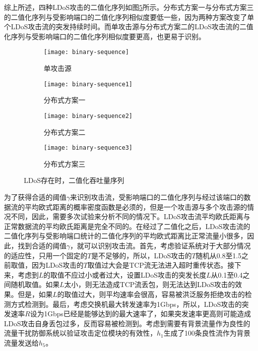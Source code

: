 综上所述，四种LDoS攻击的二值化序列如图\ref{fig:binary-sequence-all}所示。分布式方案一与分布式方案三的二值化序列与受影响端口的二值化序列相似度要低一些，因为两种方案改变了单个LDoS攻击流的突发持续时间。而单攻击源与分布式方案二的LDoS攻击流的二值化序列与受影响端口的二值化序列相似度要更高，也更易于识别。


\begin{figure}
    \begin{subfigure}{.49\textwidth}
        \centering
        \texttt{[image: binary-sequence]}
        \caption{单攻击源}
        \label{fig:binary-sequence-single}
    \end{subfigure}
    \begin{subfigure}{.49\textwidth}
        \centering
        \texttt{[image: binary-sequence1]}
        \caption{分布式方案一}
        \label{fig:binary-sequence-2h-mod1}
    \end{subfigure}

    \begin{subfigure}{.49\textwidth}
        \centering
        \texttt{[image: binary-sequence2]}
        \caption{分布式方案二}
        \label{fig:binary-sequence-2h-mod2}
    \end{subfigure}
    \begin{subfigure}{.49\textwidth}
        \centering
        \texttt{[image: binary-sequence3]}
        \caption{分布式方案三}
        \label{fig:binary-sequence-2h-mod3}
    \end{subfigure}


    \caption{LDoS存在时，二值化吞吐量序列}
    \label{fig:binary-sequence-all}
\end{figure}




为了获得合适的阈值$\gamma$来识别攻击流，受影响端口的二值化序列与经过该端口的数据流的平均欧式距离的概率密度函数是必须的，但是一个攻击源与多个攻击源的情况不同，因此，需要多次试验来分析不同的情况下。LDoS攻击流平均欧氏距离与正常数据流的平均欧氏距离是完全不同的。在经过了二值化之后，LDoS攻击流的二值化序列与受影响端口统计的二值化序列的平均欧式距离比正常流量小很多，因此，找到合适的阈值$\gamma$，就可以识别攻击流。首先，考虑验证系统对于大部分情况的适应性，只用一个固定的$T$是不足够的，所以，LDoS攻击的$T$随机从0.8至1.5之前取值，因为LDoS攻击的$T$取值过大会是TCP流无法进入超时重传状态。接下来，考虑到$L$的取值不应过小或者过大，设置LDoS攻击的突发长度$L$从0.1至0.4之间随机取值。如果$L$太小，则无法造成TCP流丢包，则无法达到LDoS攻击的效果。但是，如果$L$的取值过大，则平均速率会很高，容易被洪泛服务拒绝攻击的检测方式检测到。最后，考虑交换机最大转发速率为1Gbps，所以，LDoS攻击的突发速率$R$设为1Gbps已经是能够达到的最大速率了，如果突发速率更高则可能造成LDoS攻击自身丢包过多，反而容易被检测到。考虑到需要有背景流量作为良性的流量干扰防御系统以验证攻击定位模块的有效性，$h_1$生成了100条良性流作为背景流量发送给$h_5$。

